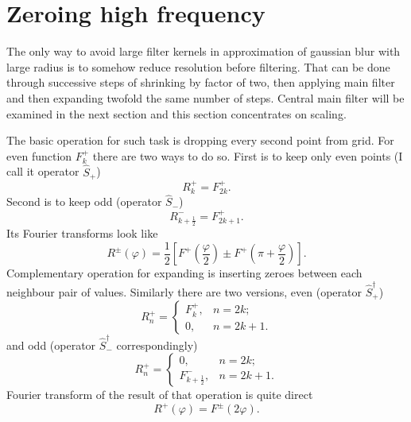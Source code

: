 \documentclass[10pt]{article}
\begin{document}
\section{Zeroing high frequency}

The only way to avoid large filter kernels in approximation of gaussian blur with large radius is to
somehow reduce resolution before filtering. That can be done through successive steps of shrinking by
factor of two, then applying main filter and then expanding twofold the same number of steps.
Central main filter will be examined in the next section and this section concentrates on scaling.

The basic operation for such task is dropping every second point from grid. For even function
$F^+_k$ there are two ways to do so. First is to keep only even points (I call it operator
$\hat S_+$)
\begin{equation}
    R^+_k = F^+_{2k}.
\end{equation}
Second is to keep odd (operator $\hat S_-$)
\begin{equation}
    R^-_{k+\frac12} = F^+_{2k+1}.
\end{equation}
Its Fourier transforms look like
\begin{equation}\label{S}
    R^\pm(\varphi) =
        \frac12 \left[F^+\left(\frac\varphi2\right) \pm F^+\left(\pi+\frac\varphi2\right)\right].
\end{equation}
Complementary operation for expanding is inserting zeroes between each neighbour pair of values.
Similarly there are two versions, even (operator $\hat S^\dagger_+$)
\begin{equation}
    R^+_n = \left\{
        \begin{array}{ll}
            F^+_k,& n = 2k;\\
            0,& n = 2k + 1.
        \end{array}
    \right.
\end{equation}
and odd (operator $\hat S^\dagger_-$ correspondingly)
\begin{equation}
    R^+_n = \left\{
        \begin{array}{ll}
            0,& n = 2k;\\
            F^-_{k+\frac12},& n = 2k + 1.
        \end{array}
    \right.
\end{equation}
Fourier transform of the result of that operation is quite direct
\begin{equation}
    R^+(\varphi) = F^\pm(2\varphi).
\end{equation}
\end{document}
